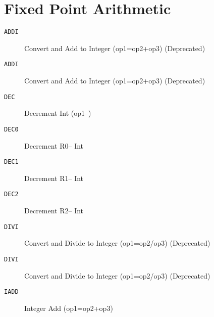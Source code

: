 \section{Fixed Point Arithmetic}
\begin{description}
\item[\texttt{ADDI       }]  Convert and Add to Integer (op1=op2+op3) (Deprecated)\\
\end{description}

\begin{description}
\item[\texttt{ADDI       }]  Convert and Add to Integer (op1=op2+op3) (Deprecated)\\
\end{description}

\begin{description}
\item[\texttt{DEC        }]  Decrement Int (op1--)\\
\end{description}

\begin{description}
\item[\texttt{DEC0       }]  Decrement R0-- Int\\
\end{description}

\begin{description}
\item[\texttt{DEC1       }]  Decrement R1-- Int\\
\end{description}

\begin{description}
\item[\texttt{DEC2       }]  Decrement R2-- Int\\
\end{description}

\begin{description}
\item[\texttt{DIVI       }]  Convert and Divide to Integer (op1=op2/op3) (Deprecated)\\
\end{description}

\begin{description}
\item[\texttt{DIVI       }]  Convert and Divide to Integer (op1=op2/op3) (Deprecated)\\
\end{description}

\begin{description}
\item[\texttt{IADD       }]  Integer Add (op1=op2+op3)\\
\end{description}
